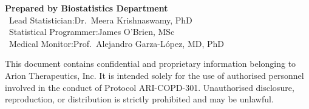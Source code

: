 \documentclass[11pt,a4paper]{article}
\begin{document}
\vspace{12mm}

\begin{center}
{\color{sapsteel}\bfseries\small Prepared by Biostatistics Department}\\[4pt]
{\small\color{sapgrey}
\ Lead Statistician:\quad Dr.\ Meera Krishnaswamy, PhD\\[2pt]
\ Statistical Programmer:\quad James O'Brien, MSc\\[2pt]
\ Medical Monitor:\quad Prof.\ Alejandro Garza-López, MD, PhD
}
\end{center}

\vspace{14mm}

\begin{tcolorbox}[sapwarn, title={\faIcon{lock}\ CONFIDENTIALITY NOTICE}]
  This document contains confidential and proprietary information belonging to
  Arion Therapeutics, Inc. It is intended solely for the use of authorised personnel
  involved in the conduct of Protocol ARI-COPD-301. Unauthorised disclosure,
  reproduction, or distribution is strictly prohibited and may be unlawful.
\end{tcolorbox}

\clearpage
\nopagecolor
\setcounter{page}{1}

\tableofcontents
\clearpage
















\end{document}
